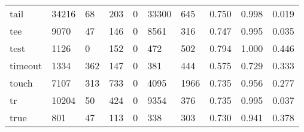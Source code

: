 \begin{longtable}{lp{2.0cm}p{2.0cm}p{2.0cm}p{2.0cm}p{2.0cm}p{2.0cm}p{2.0cm}p{2.0cm}p{2.0cm}}
tail      &                  34216 &                                 68 &                               203 &                                0 &                             33300 &                             645 &                                   0.750 &                                  0.998 &                                0.019 \\
tee       &                   9070 &                                 47 &                               146 &                                0 &                              8561 &                             316 &                                   0.747 &                                  0.995 &                                0.035 \\
test      &                   1126 &                                  0 &                               152 &                                0 &                               472 &                             502 &                                   0.794 &                                  1.000 &                                0.446 \\
timeout   &                   1334 &                                362 &                               147 &                                0 &                               381 &                             444 &                                   0.575 &                                  0.729 &                                0.333 \\
touch     &                   7107 &                                313 &                               733 &                                0 &                              4095 &                            1966 &                                   0.735 &                                  0.956 &                                0.277 \\
tr        &                  10204 &                                 50 &                               424 &                                0 &                              9354 &                             376 &                                   0.735 &                                  0.995 &                                0.037 \\
true      &                    801 &                                 47 &                               113 &                                0 &                               338 &                             303 &                                   0.730 &                                  0.941 &                                0.378 \\

\end{longtable}

